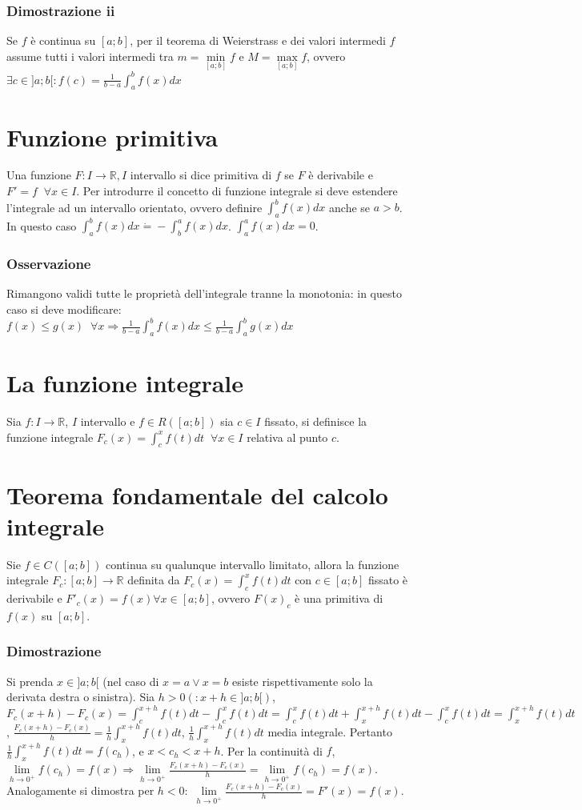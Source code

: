 \subsubsection{Dimostrazione ii}
Se $f$ \`e continua su $[a;b]$, per il teorema di Weierstrass e dei valori intermedi $f$ assume tutti i valori intermedi tra $m=\min\limits_{[a;b]} f$ e $M=\max\limits_{[a;b]} f
$, ovvero $\exists c\in ]a;b[:f(c)=\frac{1}{b-a}\int_a^b f(x)dx$
\section{Funzione primitiva}
Una funzione $F:I\rightarrow\mathbb{R}, I$ intervallo si dice primitiva di $f$ se $F$ \`e derivabile e $F'=f\;\;\forall x\in I$. Per introdurre il concetto di funzione integrale 
si deve estendere l'integrale ad un intervallo orientato, ovvero definire $\int_a^b f(x)dx$ anche se $a>b$. In questo caso $\int_a^b f(x)dx\dot{=}-\int_b^a f(x)dx$. $\int_a^a 
f(x)dx=0$.
\subsubsection{Osservazione}
Rimangono validi tutte le propriet\`a dell'integrale tranne la monotonia: in questo caso si deve modificare: $f(x)\le g(x)\;\;\forall x\Rightarrow \frac{1}{b-a}\int_a^b f(x)dx\le 
\frac{1}{b-a}\int_a^b g(x)dx$
\section{La funzione integrale}
Sia $f:I\rightarrow\mathbb{R}$, $I$ intervallo e $f\in R([a;b])$ sia $c\in I$ fissato, si definisce la funzione integrale $F_c(x)=\int_c^x f(t)dt\;\;\forall x\in I$ relativa al 
punto $c$.
\section{Teorema fondamentale del calcolo integrale}
Sie $f\in C([a;b])$ continua su qualunque intervallo limitato, allora la funzione integrale $F_c:[a;b]\rightarrow\mathbb{R}$ definita da $F_c(x)=\int_c^x f(t)dt$ con $c\in[a;b]$ 
fissato \`e derivabile e $F'_c(x)=f(x)\forall x\in[a;b]$, ovvero $F(x)_c$ \`e una primitiva di $f(x)$ su $[a;b]$.
\subsubsection{Dimostrazione}
Si prenda $x\in]a;b[$ (nel caso di $x=a\lor x=b$ esiste rispettivamente solo la derivata destra o sinistra). Sia $h>0(:x+h\in]a;b[)$, $F_c(x+h)-F_c(x)=\int_c^{x+h}f(t)dt-
\int_c^xf(t)dt=\int_c^xf(t)dt+\int_x^{x+h}f(t)dt-\int_c^xf(t)dt=\int_x^{x+h}f(t)dt$, $\frac{F_c(x+h)-F_c(x)}{h}=\frac{1}{h}\int_x^{x+h}f(t)dt$, $\frac{1}{h}\int_x^{x+h}f(t)dt$  
media integrale. Pertanto $\frac{1}{h}\int_x^{x+h}f(t)dt=f(c_h)$, e $x<c_h<x+h$. Per la continuit\`a di $f$, $\lim\limits_{h\rightarrow0^+}f(c_h)=f(x)\Rightarrow\lim\limits_{h
\rightarrow0^+}\frac{F_c(x+h)-F_c(x)}{h}=\lim\limits_{h\rightarrow0^+}f(c_h)=f(x)$. Analogamente si dimostra per $h<0:$ $\lim\limits_{h\rightarrow0^+}\frac{F_c(x+h)-F_c(x)}{h}
=F'(x)=f(x)$.
